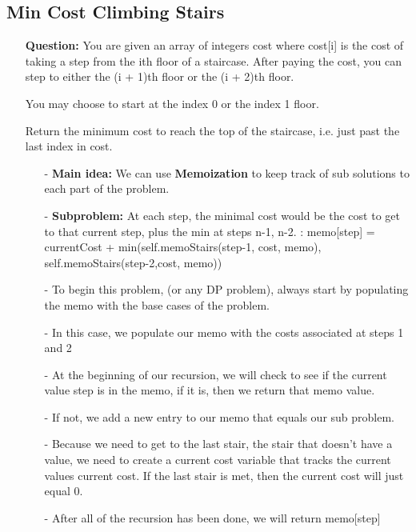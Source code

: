 \documentclass[12pt]{article}
\begin{document}
\subsection{Min Cost Climbing Stairs}
\begin{enumerate}
  \item[] \textbf{Question:}
      You are given an array of integers cost where cost[i] is the cost of taking a step from the ith floor of a staircase. After paying the cost, you can step to either the (i + 1)th floor or the (i + 2)th floor.

      You may choose to start at the index 0 or the index 1 floor.

      Return the minimum cost to reach the top of the staircase, i.e. just past the last index in cost.

    \begin{enumerate}
      \item[-] \textbf{Main idea:} We can use \textbf{Memoization} to keep track of sub solutions to each part of the problem. 
      \item[-] \textbf{Subproblem:} At each step, the minimal cost would be the cost to get to that current step, plus the min at steps n-1, n-2. : memo[step] = currentCost + min(self.memoStairs(step-1, cost, memo), self.memoStairs(step-2,cost, memo))
      \item[-] To begin this problem, (or any DP problem), always start by populating the memo with the base cases of the problem.
      \item[-] In this case, we populate our memo with the costs associated at steps 1 and 2
      \item[-] At the beginning of our recursion, we will check to see if the current value step is in the memo, if it is, then we return that memo value. 
      \item[-] If not, we add a new entry to our memo that equals our sub problem. 
      \item[-] Because we need to get to the last stair, the stair that doesn't have a value, we need to create a current cost variable that tracks the current values current cost. If the last stair is met, then the current cost will just equal 0. 
      \item[-] After all of the recursion has been done, we will return memo[step]
    \end{enumerate}
\end{enumerate}
\end{document}
